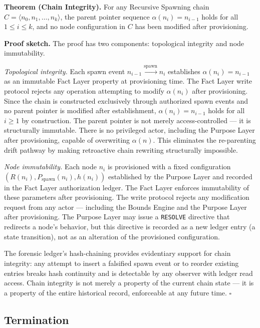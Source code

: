 \medskip
\noindent\textbf{Theorem (Chain Integrity).} For any Recursive Spawning chain $C = \langle n_0, n_1, \ldots, n_k \rangle$, the parent pointer sequence $\alpha(n_i) = n_{i-1}$ holds for all $1 \leq i \leq k$, and no node configuration in $C$ has been modified after provisioning.

\medskip
\noindent\textbf{Proof sketch.} The proof has two components: topological integrity and node immutability.

\medskip
\textit{Topological integrity.} Each spawn event $n_{i-1} \xrightarrow{\mathrm{spawn}} n_i$ establishes $\alpha(n_i) = n_{i-1}$ as an immutable Fact Layer property at provisioning time. The Fact Layer write protocol rejects any operation attempting to modify $\alpha(n_i)$ after provisioning. Since the chain is constructed exclusively through authorized spawn events and no parent pointer is modified after establishment, $\alpha(n_i) = n_{i-1}$ holds for all $i \geq 1$ by construction. The parent pointer is not merely access-controlled --- it is structurally immutable. There is no privileged actor, including the Purpose Layer after provisioning, capable of overwriting $\alpha(n)$. This eliminates the re-parenting drift pathway by making retroactive chain rewriting structurally impossible.

\medskip
\textit{Node immutability.} Each node $n_i$ is provisioned with a fixed configuration $(R(n_i), P_{\mathrm{spawn}}(n_i), h(n_i))$ established by the Purpose Layer and recorded in the Fact Layer authorization ledger. The Fact Layer enforces immutability of these parameters after provisioning. The write protocol rejects any modification request from any actor --- including the Bounds Engine and the Purpose Layer after provisioning. The Purpose Layer may issue a \texttt{RESOLVE} directive that redirects a node's behavior, but this directive is recorded as a new ledger entry (a state transition), not as an alteration of the provisioned configuration.

The forensic ledger's hash-chaining provides evidentiary support for chain integrity: any attempt to insert a falsified spawn event or to reorder existing entries breaks hash continuity and is detectable by any observer with ledger read access. Chain integrity is not merely a property of the current chain state --- it is a property of the entire historical record, enforceable at any future time. $\square$

\subsection{Termination}
\label{sec:rs-termination}

